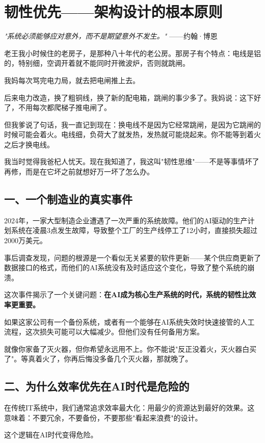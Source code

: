 \chapter{韧性优先——架构设计的根本原则}


\textit{"系统必须能够应对意外，而不是期望意外不发生。"}
——约翰·博恩


老王我小时候住的老房子，是那种八十年代的老公房。那房子有个特点：电线是铝的，特别细，空调开着就不能同时开微波炉，否则就跳闸。

我妈每次骂完电力局，就去把电闸推上去。

后来电力改造，换了粗铜线，换了新的配电箱，跳闸的事少多了。我妈说：这下好了，不用每次都爬梯子推电闸了。

但我爹说了句话，我一直记到现在：换电线不是因为它经常跳闸，是因为它跳闸的时候可能会着火。电线细，负荷大了就发热，发热就可能烧起来。你不能等到着火之后才换电线。

我当时觉得我爸杞人忧天。现在我知道了，我这叫"韧性思维"——不是等事情坏了再修，而是在它坏之前就想好万一坏了怎么办。

\section{一、一个制造业的真实事件}


2024年，一家大型制造企业遭遇了一次严重的系统故障。他们的AI驱动的生产计划系统在凌晨3点发生故障，导致整个工厂的生产线停工了12小时，直接损失超过2000万美元。

事后调查发现，问题的根源是一个看似无关紧要的软件更新——某个供应商更新了数据接口的格式，而他们的AI系统没有及时适应这个变化，导致了整个系统的崩溃。

这次事件揭示了一个关键问题：\textbf{在AI成为核心生产系统的时代，系统的韧性比效率更重要。}

如果这家公司有一个备份系统，或者有一个能够在AI系统失效时快速接管的人工流程，这次损失可能可以大幅减少。但他们没有任何备用方案。

就像你家备了灭火器，但你希望永远用不上。你不能说"反正没着火，灭火器白买了"。等真着火了，你再后悔没多备几个灭火器，那就晚了。

\section{二、为什么效率优先在AI时代是危险的}


在传统IT系统中，我们通常追求效率最大化：用最少的资源达到最好的效果。这意味着：不要冗余，不要备份，不要那些"看起来浪费"的设计。

这个逻辑在AI时代变得危险。

